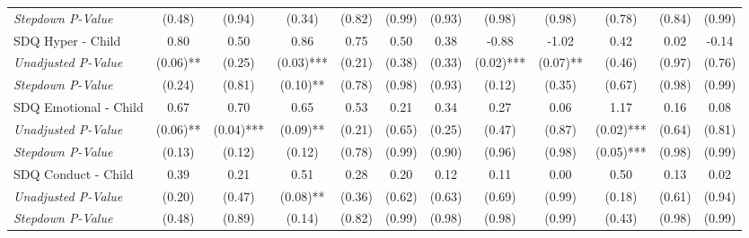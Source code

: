 \begin{tabular}{l c c c c c c c c c c c}
\quad \textit{Stepdown P-Value} & (0.48) & (0.94) & (0.34) & (0.82) & (0.99) & (0.93) & (0.98) & (0.98) & (0.78) & (0.84) & (0.99) \\
SDQ Hyper - Child & 0.80 & 0.50 & 0.86 & 0.75 & 0.50 & 0.38 & -0.88 & -1.02 & 0.42 & 0.02 & -0.14 \\
\quad \textit{Unadjusted P-Value} & (0.06)** & (0.25) & (0.03)*** & (0.21) & (0.38) & (0.33) & (0.02)*** & (0.07)** & (0.46) & (0.97) & (0.76) \\
\quad \textit{Stepdown P-Value} & (0.24) & (0.81) & (0.10)** & (0.78) & (0.98) & (0.93) & (0.12) & (0.35) & (0.67) & (0.98) & (0.99) \\
SDQ Emotional - Child & 0.67 & 0.70 & 0.65 & 0.53 & 0.21 & 0.34 & 0.27 & 0.06 & 1.17 & 0.16 & 0.08 \\
\quad \textit{Unadjusted P-Value} & (0.06)** & (0.04)*** & (0.09)** & (0.21) & (0.65) & (0.25) & (0.47) & (0.87) & (0.02)*** & (0.64) & (0.81) \\
\quad \textit{Stepdown P-Value} & (0.13) & (0.12) & (0.12) & (0.78) & (0.99) & (0.90) & (0.96) & (0.98) & (0.05)*** & (0.98) & (0.99) \\
SDQ Conduct - Child & 0.39 & 0.21 & 0.51 & 0.28 & 0.20 & 0.12 & 0.11 & 0.00 & 0.50 & 0.13 & 0.02 \\
\quad \textit{Unadjusted P-Value} & (0.20) & (0.47) & (0.08)** & (0.36) & (0.62) & (0.63) & (0.69) & (0.99) & (0.18) & (0.61) & (0.94) \\
\quad \textit{Stepdown P-Value} & (0.48) & (0.89) & (0.14) & (0.82) & (0.99) & (0.98) & (0.98) & (0.99) & (0.43) & (0.98) & (0.99) \\
\bottomrule
\end{tabular}
